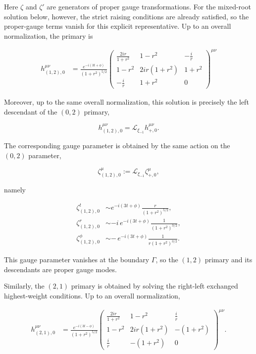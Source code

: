 Here \(\displaystyle{\zeta}\) and \(\displaystyle{\zeta'}\) are generators of proper gauge transformations. For the mixed-root solution below, however, the strict raising conditions are already satisfied, so the proper-gauge terms vanish for this explicit representative. Up to an overall normalization, the primary is

\begin{align}
h^{\mu \nu}_{(1,2),0}
&=\frac{e^{-i(3t+\phi)}}{(1+r^{2})^{5/2}}\begin{pmatrix}
\frac{2ir}{1+r^{2}} & 1-r^{2} & -\frac{i}{r} \\
1-r^{2} & 2ir(1+r^{2}) & 1+r^{2} \\
-\frac{i}{r} & 1+r^{2} & 0
\end{pmatrix}^{\mu \nu}
\end{align}

Moreover, up to the same overall normalization, this solution is precisely the left descendant of the \((0,2)\) primary,

\[
h_{(1,2),0}^{\mu\nu}=\mathcal{L}_{\xi_{-1}}h_{+,0}^{\mu\nu}.
\]

The corresponding gauge parameter is obtained by the same action on the \((0,2)\) parameter,

\[
\zeta_{(1,2),0}^{\mu}
:=\mathcal{L}_{\xi_{-1}}\zeta_{+,0}^{\mu},
\]

namely

\begin{align}
\zeta_{(1,2),0}^{t}&\sim e^{-i(3t+\phi)}\frac{r}{(1+r^2)^{5/2}},\\
\zeta_{(1,2),0}^{r}&\sim-i\,e^{-i(3t+\phi)}\frac{1}{(1+r^2)^{3/2}},\\
\zeta_{(1,2),0}^{\phi}&\sim -\,e^{-i(3t+\phi)}\frac{1}{r(1+r^2)^{3/2}}.
\end{align}

This gauge parameter vanishes at the boundary \(\displaystyle{\Gamma}\), so the \((1,2)\) primary and its descendants are proper gauge modes.

Similarly, the \((2,1)\) primary is obtained by solving the right-left exchanged highest-weight conditions. Up to an overall normalization,

\begin{align}
h^{\mu \nu}_{(2,1),0}
&=\frac{e^{-i(3t-\phi)}}{(1+r^{2})^{5/2}}\begin{pmatrix}
\frac{2ir}{1+r^{2}} & 1-r^{2} & \frac{i}{r} \\
1-r^{2} & 2ir(1+r^{2}) & -(1+r^{2}) \\
\frac{i}{r} & -(1+r^{2}) & 0
\end{pmatrix}^{\mu \nu}.
\end{align}


